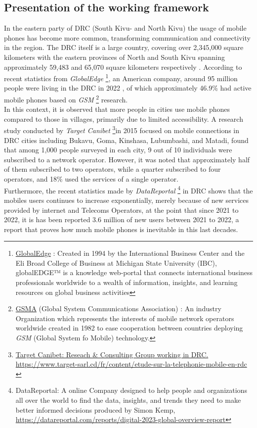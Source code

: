 \documentclass[12pt,a4paper, oneside]{book}
\begin{document}
		\subsection{Presentation of the working framework}  
		In the eastern party of DRC (South Kivu- and North Kivu) the usage of mobile phones has become more common, transforming communication and connectivity in the region. 
	The DRC itself is a large country, covering over 2,345,000 square kilometers with the eastern provinces of North and South Kivu spanning approximately 59,483 and 65,070 square kilometers respectively \citep{giswatch2018}. According to recent statistics from \textit{GlobalEdge} \footnote{ \href{https://globaledge.msu.edu/}{GlobalEdge}  : Created in 1994 by the International Business Center and the Eli Broad College of Business at Michigan State University (IBC), globalEDGE™ is a knowledge web-portal that connects international business professionals worldwide to a wealth of information, insights, and learning resources on global business activities}, an American company, around 95 million people were living in the DRC in 2022 \citep{monusco2015}, of which approximately 46.9\% had active mobile phones based on \textit{GSM} \footnote{\href{https://www.gsma.com/aboutus/}{GSMA}  (Global System Communications Association) : An industry Organization which represents the interests of mobile network operators worldwide created in 1982 to ease cooperation between countries deploying \textit{GSM} (Global System fo Mobile) technology.} research. \\ 
		
		In this context, it is observed that more people in cities use mobile phones compared to those in villages, primarily due to limited accessibility. A research study conducted by \textit{Target Canibet} \footnote{\href{https://www.target-sarl.cd/fr/content/etude-sur-la-telephonie-mobile-en-rdc}{Target Canibet: Reseach \& Consulting Group working in DRC. \url{https://www.target-sarl.cd/fr/content/etude-sur-la-telephonie-mobile-en-rdc} }}in 2015 focused on mobile connections in DRC cities including Bukavu, Goma, Kinshasa, Lubumbashi, and Matadi, found that among 1,000 people surveyed in each city, 9 out of 10 individuals were subscribed to a network operator. However, it was noted that approximately half of them subscribed to two operators, while a quarter subscribed to four operators, and 18\% used the services of a single operator.  \\
		
		Furthermore, the recent statistics made by \textit{DataReportal} \footnote{DataReportal: A online Company designed to help people and organizations all over the world to find the data, insights, and trends they need to make better informed decisions produced by Simon Kemp, \url{https://datareportal.com/reports/digital-2023-global-overview-report}}  in DRC shows that the mobiles users continues to increase exponentially, merely because of new services provided by internet and Telecoms Operators, at the point that since 2021 to 2022, it is has been reported 3.6 million of new users between 2021 to 2022, a report that proves how much mobile phones is inevitable in this last decades.
			
\end{document}
